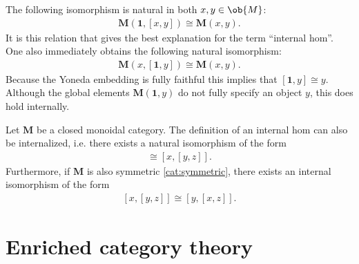     \begin{property}\label{cat:internal_hom_property}
        The following isomorphism is natural in both $x,y\in\ob{M}$:
        \begin{gather}
            \mathbf{M}(\mathbf{1},[x,y])\cong\mathbf{M}(x,y).
        \end{gather}
        It is this relation that gives the best explanation for the term ``internal hom''. One also immediately obtains the following natural isomorphism:
        \begin{gather}
            \mathbf{M}(x,[\mathbf{1},y])\cong\mathbf{M}(x,y).
        \end{gather}
        Because the Yoneda embedding is fully faithful this implies that $[\mathbf{1},y]\cong y$. Although the global elements $\mathbf{M}(\mathbf{1},y)$ do not fully specify an object $y$, this does hold internally.
    \end{property}

    \begin{property}[Symmetry]
        Let $\mathbf{M}$ be a closed monoidal category. The definition of an internal hom can also be internalized, i.e. there exists a natural isomorphism of the form
        \begin{gather}
            [x\otimes y,z]\cong[x,[y,z]].
        \end{gather}
        Furthermore, if $\mathbf{M}$ is also symmetric \ref{cat:symmetric}, there exists an internal isomorphism of the form
        \begin{gather}
            \label{cat:internal_symmetry}
            [x,[y,z]]\cong[y,[x,z]].
        \end{gather}
    \end{property}


\section{Enriched category theory}\label{section:enriched_category_theory}

